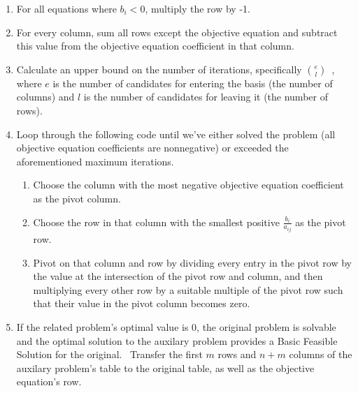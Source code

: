 \documentclass[11pt]{article}
\begin{document}
\begin{enumerate}
\item For all equations where $b_i < 0$, multiply the row by -1.~\cite{wolfram}
\item For every column, sum all rows except the objective equation and subtract this value from the objective equation coefficient in that column.~\cite{wolfram}
\item Calculate an upper bound on the number of iterations, specifically $e \choose l$~\cite{chvatal83}, where $e$ is the number of candidates for entering the basis (the number of columns) and $l$ is the number of candidates for leaving it (the number of rows). 
\item Loop through the following code until we've either solved the problem (all objective equation coefficients are nonnegative) or exceeded the aforementioned maximum iterations.
  \begin{enumerate}
  \item Choose the column with the most negative objective equation coefficient as the pivot column.~\cite{wolfram}
  \item Choose the row in that column with the smallest positive $\frac{b_i}{a_{ij}}$ as the pivot row.~\cite{wolfram}
  \item Pivot on that column and row by dividing every entry in the pivot row by the value at the intersection of the pivot row and column, and then multiplying every other row by a suitable multiple of the pivot row such that their value in the pivot column becomes zero.~\cite{chvatal83}
  \end{enumerate}
\item If the related problem's optimal value is 0, the original problem is solvable and the optimal solution to the auxilary problem provides a Basic Feasible Solution for the original.~\cite{chvatal83} Transfer the first $m$ rows and $n+m$ columns of the auxilary problem's table to the original table, as well as the objective equation's row.
\end{enumerate}
\end{document}
